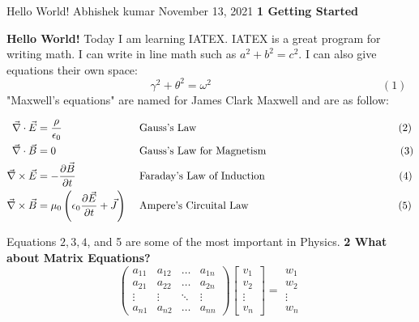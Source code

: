 Hello World!
Abhishek kumar
November 13, 2021
\textbf{1  Getting Started}

\textbf{Hello World!} Today I am learning IATEX. IATEX is a great program for writing math. I can write in line math such as $a^{2}+b^{2}=c^{2}$. I can also give equations their own space:
$$
\hspace{12em}\gamma^{2}+\theta^{2}=\omega^{2}\hspace{15em}(1)                   
$$
"Maxwell's equations" are named for James Clark Maxwell and are as follow:

$\begin{aligned}\vec{\nabla} \cdot \vec{E} &=\frac{\rho}{\epsilon_{0}} & & \text { Gauss's Law }\hspace{19em}(2)  
\\\vec{\nabla} \cdot \vec{B} &=0 & & \text { Gauss's Law for Magnetism }\hspace{12.5em}(3)  
\\\vec{\nabla} \times \vec{E} &=-\frac{\partial \vec{B}}{\partial t} & & \text { Faraday's Law of Induction }\hspace{12.5em}(4)  
\\\vec{\nabla} \times \vec{B} &=\mu_{0}\left(\epsilon_{0} \frac{\partial \vec{E}}{\partial    t}+\vec{J}\right) & & \text { Ampere's Circuital Law }\hspace{14em}(5)  \end{aligned}$

Equations $2,3,4$, and 5 are some of the most important in Physics.
\textbf{2 What about Matrix Equations?}
$$
\left(\begin{array}{cccc}
a_{11} & a_{12} & \ldots & a_{1 n} \\
a_{21} & a_{22} & \ldots & a_{2 n} \\
\vdots & \vdots & \ddots & \vdots \\
a_{n 1} & a_{n 2} & \ldots & a_{n n}
\end{array}\right)\left[\begin{array}{c}
v_{1} \\
v_{2} \\
\vdots \\
v_{n}
\end{array}\right]=\begin{array}{c}
w_{1} \\
w_{2} \\
\vdots \\
w_{n}
\end{array}
$$
